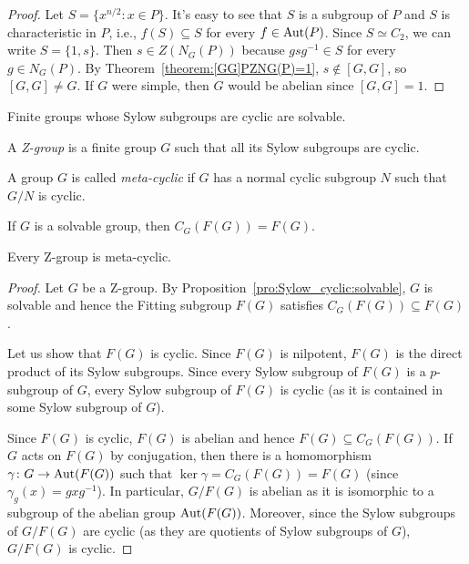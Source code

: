 \begin{proof}
	Let $S=\{x^{n/2}:x\in P\}$. It's easy to see that $S$ is a subgroup of $P$ and $S$ is characteristic in $P$, i.e., $f(S)\subseteq S$ for every $f\in\operatorname{Aut}(P)$. Since $S\simeq C_2$, we can write $S=\{1,s\}$. Then $s\in Z(N_G(P))$ because $gsg^{-1}\in S$ for every $g\in N_G(P)$. By Theorem~\ref{theorem:[GG]PZNG(P)=1}, $s\not\in[G,G]$, so $[G,G]\ne G$. If $G$ were simple, then $G$ would be abelian since $[G,G]=1$.
\end{proof}

Finite groups whose Sylow subgroups are cyclic are solvable.

\begin{definition}
	A \emph{Z-group} is a finite group $G$ such that all its Sylow subgroups are cyclic.
\end{definition}

\begin{definition}
A group $G$ is called \emph{meta-cyclic} if $G$ has a normal cyclic subgroup $N$ such that $G/N$ is cyclic.
\end{definition}

\begin{exercise}
	If $G$ is a solvable group, then $C_G(F(G))=F(G)$.
\end{exercise}

\begin{theorem}
	\label{theorem:Z=>metacyclic}
	Every Z-group is meta-cyclic.
\end{theorem}

\begin{proof}
	Let $G$ be a Z-group. By Proposition~\ref{pro:Sylow_cyclic:solvable}, $G$ is solvable and hence the Fitting subgroup $F(G)$ satisfies $C_G(F(G))\subseteq F(G)$. 
	
	Let us show that $F(G)$ is cyclic. Since $F(G)$ is nilpotent, $F(G)$ is the direct product of its Sylow subgroups. Since every Sylow subgroup of $F(G)$ is a $p$-subgroup of $G$, every Sylow subgroup of $F(G)$ is cyclic (as it is contained in some Sylow subgroup of $G$). 
	
	Since $F(G)$ is cyclic, $F(G)$ is abelian and hence $F(G)\subseteq C_G(F(G))$. If $G$ acts on $F(G)$ by conjugation, then there is a homomorphism $\gamma\colon G\to\operatorname{Aut}(F(G))$ such that $\ker\gamma=C_G(F(G))=F(G)$ (since $\gamma_g(x)=gxg^{-1}$). In particular, $G/F(G)$ is abelian as it is isomorphic to a subgroup of the abelian group $\operatorname{Aut}(F(G))$. Moreover, since the Sylow subgroups of $G/F(G)$ are cyclic (as they are quotients of Sylow subgroups of $G$), $G/F(G)$ is cyclic.
\end{proof}

